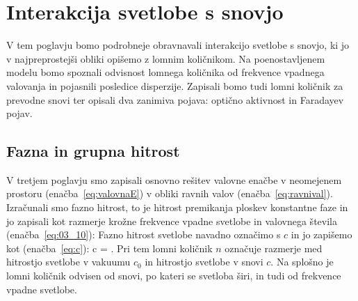 
\chapter{Interakcija svetlobe s snovjo}
V tem poglavju bomo podrobneje obravnavali interakcijo svetlobe s snovjo, ki jo 
v najpreprostejši obliki opišemo z lomnim količnikom. Na poenostavljenem modelu
bomo spoznali odvisnost lomnega količnika od frekvence vpadnega valovanja in pojasnili
posledice disperzije. Zapisali bomo tudi lomni količnik za prevodne snovi ter
opisali dva zanimiva pojava: optično aktivnost in Faradayev pojav.

\section{Fazna in grupna hitrost}
V tretjem poglavju smo zapisali osnovno rešitev valovne enačbe
v neomejenem prostoru (enačba~\ref{eq:valovnaE}) v obliki ravnih valov 
(enačba~\ref{eq:ravnival}). Izračunali smo fazno hitrost,
to je hitrost premikanja ploskev konstantne faze in
jo zapisali kot razmerje krožne frekvence vpadne svetlobe 
in valovnega števila (enačba~\ref{eq:03_10}):
Fazno hitrost svetlobe navadno označimo s $c$ in jo zapišemo kot (enačba~\ref{eq:c}):
\beq
c = .
\label{eq:09_01}
\eeq
Pri tem lomni količnik $n$ označuje razmerje med hitrostjo svetlobe v 
vakuumu $c_0$ in hitrostjo svetlobe v snovi $c$. Na splošno je lomni količnik odvisen 
od snovi, po kateri se svetloba širi, in tudi od frekvence vpadne svetlobe.

